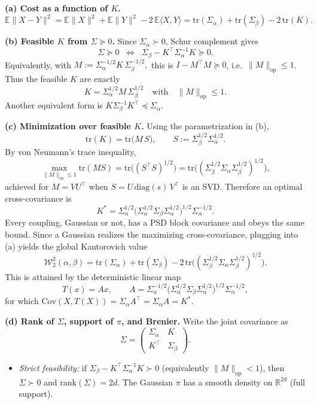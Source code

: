 \documentclass[11pt,a4paper]{article}
\theoremstyle{exostyle}
\newcommand{\R}{\mathbb{R}}
\newcommand{\Wtwo}{\mathcal{W}_2}
\begin{document}
\begin{solution}
\textbf{(a) Cost as a function of $K$.}
\[
\mathbb E\|X-Y\|^2=\mathbb E\|X\|^2+\mathbb E\|Y\|^2-2\,\mathbb E\langle X,Y\rangle
=\mathrm{tr}(\Sigma_\alpha)+\mathrm{tr}(\Sigma_\beta)-2\,\mathrm{tr}(K).
\]

\medskip
\textbf{(b) Feasible $K$ from $\Sigma\succeq0$.}
Since $\Sigma_\alpha\succ0$, Schur complement gives
\[
\Sigma\succeq0
\;\;\Longleftrightarrow\;\;
\Sigma_\beta-K^\top\Sigma_\alpha^{-1}K\succeq0.
\]
Equivalently, with
\(
M:=\Sigma_\alpha^{-1/2}K\,\Sigma_\beta^{-1/2},
\)
this is $I-M^\top M\succeq0$, i.e.\ $\|M\|_{\mathrm{op}}\le1$.
Thus the feasible $K$ are exactly
\[
\boxed{\;K=\Sigma_\alpha^{1/2} M\,\Sigma_\beta^{1/2}\quad\text{with}\quad \|M\|_{\mathrm{op}}\le1.\;}
\]
Another equivalent form is $K\Sigma_\beta^{-1}K^\top\preceq \Sigma_\alpha$.

\medskip
\textbf{(c) Minimization over feasible $K$.}
Using the parametrization in (b),
\[
\mathrm{tr}(K)=\mathrm{tr}\!\big(M\,S\big),\qquad
S:=\Sigma_\beta^{1/2}\Sigma_\alpha^{1/2}.
\]
By von Neumann's trace inequality,
\[
\max_{\|M\|_{\mathrm{op}}\le1}\mathrm{tr}(MS)
=\mathrm{tr}\big((S^\top S)^{1/2}\big)
=\mathrm{tr}\Big((\Sigma_\beta^{1/2}\Sigma_\alpha\Sigma_\beta^{1/2})^{1/2}\Big),
\]
achieved for $M=VU^\top$ when $S=U\,\mathrm{diag}(s)\,V^\top$ is an SVD.
Therefore an optimal cross-covariance is
\[
\boxed{\;K^*=\Sigma_\alpha^{1/2}\big(\Sigma_\alpha^{1/2}\Sigma_\beta\Sigma_\alpha^{1/2}\big)^{1/2}\Sigma_\alpha^{-1/2}. \;}
\]
Every coupling, Gaussian or not, has a PSD block covariance and obeys the same bound. Since a Gaussian realizes the maximizing cross-covariance, plugging into (a) yields the global Kantorovich value
\[
\boxed{\;
\Wtwo^2(\alpha,\beta)=\mathrm{tr}(\Sigma_\alpha)+\mathrm{tr}(\Sigma_\beta)
-2\,\mathrm{tr}\Big((\Sigma_\beta^{1/2}\Sigma_\alpha\Sigma_\beta^{1/2})^{1/2}\Big).
\;}
\]
This is attained by the deterministic linear map
\[
\boxed{\;T(x)=A x,\qquad
A=\Sigma_\alpha^{-1/2}\big(\Sigma_\alpha^{1/2}\Sigma_\beta\Sigma_\alpha^{1/2}\big)^{1/2}\Sigma_\alpha^{-1/2},\;}
\]
for which $\mathrm{Cov}(X,T(X))=\Sigma_\alpha A^\top=\Sigma_\alpha A=K^*$.

\medskip
\textbf{(d) Rank of $\Sigma$, support of $\pi$, and Brenier.}
Write the joint covariance as
\[
\Sigma=\begin{pmatrix}\Sigma_\alpha & K\\ K^\top & \Sigma_\beta\end{pmatrix}.
\]
\begin{itemize}[itemsep=2pt]
\item \emph{Strict feasibility:} if $\Sigma_\beta-K^\top\Sigma_\alpha^{-1}K\succ0$ (equivalently $\|M\|_{\mathrm{op}}<1$), then $\Sigma\succ0$ and $\mathrm{rank}(\Sigma)=2d$. The Gaussian $\pi$ has a smooth density on $\R^{2d}$ (full support).


\end{itemize}
\end{solution}
\end{document}

